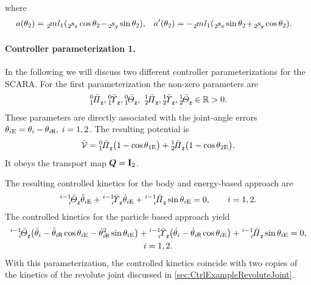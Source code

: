 where
\begin{align}
 a(\jointAngle[2]) &= \bodyMass{}{2} l_1 (\bodyCOMCoeff{}{2}{\idxX} \cos\jointAngle[2] \!-\! \bodyCOMCoeff{}{2}{\idxY} \sin\jointAngle[2]),&
 a'(\jointAngle[2]) &= -\bodyMass{}{2} l_1 (\bodyCOMCoeff{}{2}{\idxX} \sin\jointAngle[2] \!+\! \bodyCOMCoeff{}{2}{\idxY} \cos\jointAngle[2]).
\end{align}

\paragraph{Controller parameterization 1.}
In the following we will discuss two different controller parameterizations for the SCARA.
For the first parameterization the non-zero parameters are
\begin{align}
 \bodyMOSCoeffC{0}{1}{\idxZ}, 
 \bodyMODCoeffC{0}{1}{\idxZ}, 
 \bodyMOICoeffC{0}{1}{\idxZ}, \
 \bodyMOSCoeffC{1}{2}{\idxZ}, 
 \bodyMODCoeffC{1}{2}{\idxZ},
 \bodyMOICoeffC{1}{2}{\idxZ} \in \RealNum > 0.
\end{align}
These parameters are directly associated with the joint-angle errors $\jointAngleE[i] = \jointAngle[i] - \jointAngleR[i],\; i=1,2$.
The resulting potential is
\begin{align}
 \potentialEnergyC = \bodyMOSCoeffC{0}{1}{\idxZ} \big( 1-\cos \jointAngleE[1] \big) + \bodyMOSCoeffC{1}{2}{\idxZ}\big( 1-\cos\jointAngleE[2] \big).
\end{align}
It obeys the transport map $\sysTransportMap = \idMat[2]$.

The resulting controlled kinetics for the body and energy-based approach are
\begin{align}\label{eq:ScaraClosedLoop11}
 \bodyMOICoeffC{i-1}{i}{\idxZ} \jointAngleEdd[i]
 + \bodyMODCoeffC{i-1}{i}{\idxZ} \jointAngleEd[i]
 + \bodyMOSCoeffC{i-1}{i}{\idxZ} \sin \jointAngleE[i]
 = 0, \qquad i=1,2.
\end{align}
The controlled kinetics for the particle based approach yield
\begin{multline}\label{eq:ScaraClosedLoop12}
 \bodyMOICoeffC{i-1}{i}{\idxZ} \big( \jointAngledd[i] - \jointAngleRdd[i]\cos\jointAngleE[i] - \jointAngleRd[i]^2 \sin\jointAngleE[i] \big)
 + \bodyMODCoeffC{i-1}{i}{\idxZ} \big( \jointAngled[i] - \jointAngleRd[i]\cos\jointAngleE[i] \big)
 + \bodyMOSCoeffC{i-1}{i}{\idxZ} \sin \jointAngleE[i]
 = 0,
\\
 i=1,2.
\end{multline}
With this parameterization, the controlled kinetics coincide with two copies of the kinetics of the revolute joint discussed in \autoref{sec:CtrlExampleRevoluteJoint}.


